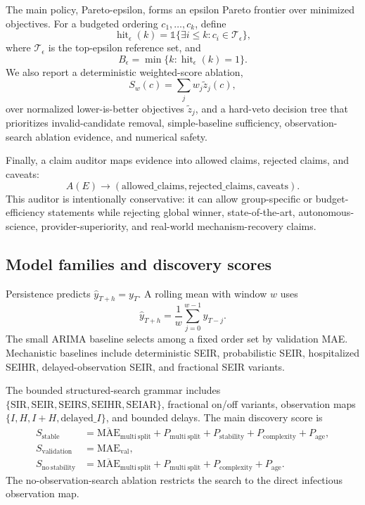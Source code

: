 The main policy, Pareto-epsilon, forms an epsilon Pareto frontier over
minimized objectives. For a budgeted ordering $c_1,\ldots,c_k$, define
\begin{equation}
\operatorname{hit}_{\epsilon}(k)
= \mathbb{1}\{\exists i\leq k: c_i\in \mathcal{T}_{\epsilon}\},
\end{equation}
where $\mathcal{T}_{\epsilon}$ is the top-epsilon reference set, and
\begin{equation}
B_{\epsilon} = \min\{k:\operatorname{hit}_{\epsilon}(k)=1\}.
\end{equation}
We also report a deterministic weighted-score ablation,
\begin{equation}
S_w(c)=\sum_j w_j\tilde{z}_j(c),
\end{equation}
over normalized lower-is-better objectives $\tilde{z}_j$, and a hard-veto
decision tree that prioritizes invalid-candidate removal, simple-baseline
sufficiency, observation-search ablation evidence, and numerical safety.

Finally, a claim auditor maps evidence into allowed claims, rejected claims,
and caveats:
\begin{equation}
A(E)\rightarrow
(\mathrm{allowed\_claims},\mathrm{rejected\_claims},\mathrm{caveats}).
\end{equation}
This auditor is intentionally conservative: it can allow group-specific or
budget-efficiency statements while rejecting global winner, state-of-the-art,
autonomous-science, provider-superiority, and real-world mechanism-recovery
claims.

\subsection{Model families and discovery scores}

Persistence predicts $\hat{y}_{T+h}=y_T$. A rolling mean with window $w$ uses
\begin{equation}
\hat{y}_{T+h}=\frac{1}{w}\sum_{j=0}^{w-1}y_{T-j}.
\end{equation}
The small ARIMA baseline selects among a fixed order set by validation MAE.
Mechanistic baselines include deterministic SEIR, probabilistic SEIR,
hospitalized SEIHR, delayed-observation SEIR, and fractional SEIR variants.

The bounded structured-search grammar includes
$\{\mathrm{SIR},\mathrm{SEIR},\mathrm{SEIRS},\mathrm{SEIHR},\mathrm{SEIAR}\}$,
fractional on/off variants, observation maps $\{I,H,I+H,\mathrm{delayed}\_I\}$,
and bounded delays. The main discovery score is
\begin{align}
S_{\mathrm{stable}} &=
\overline{\mathrm{MAE}}_{\mathrm{multi\ split}}
+P_{\mathrm{multi\ split}}+P_{\mathrm{stability}}
+P_{\mathrm{complexity}}+P_{\mathrm{age}},\\
S_{\mathrm{validation}} &= \mathrm{MAE}_{\mathrm{val}},\\
S_{\mathrm{no\ stability}} &=
\overline{\mathrm{MAE}}_{\mathrm{multi\ split}}
+P_{\mathrm{multi\ split}}+P_{\mathrm{complexity}}+P_{\mathrm{age}}.
\end{align}
The no-observation-search ablation restricts the search to the direct
infectious observation map.
